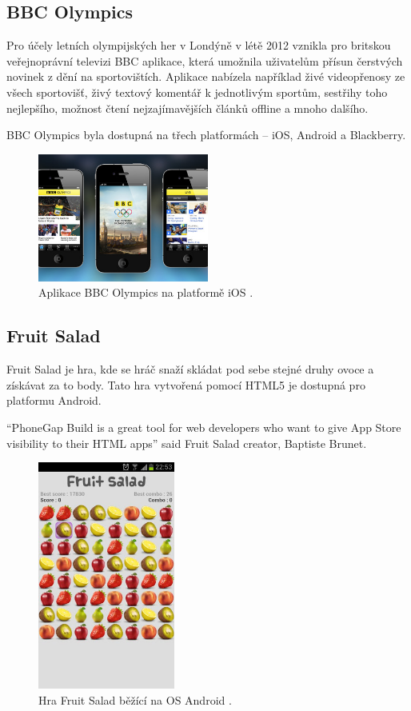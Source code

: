 \subsection{BBC Olympics}
Pro účely letních olympijských her v Londýně v létě 2012 vznikla pro britskou veřejnoprávní televizi BBC aplikace, která umožnila uživatelům přísun čerstvých novinek z dění na sportovištích. Aplikace nabízela například živé videopřenosy ze všech sportovišť, živý textový komentář k jednotlivým sportům, sestřihy toho nejlepšího, možnost čtení nejzajímavějších článků offline a mnoho dalšího. \cite{phonegap_bbc_olympics_app}

BBC Olympics byla dostupná na třech platformách – iOS, Android a Blackberry.

\begin{figure}\centering
\includegraphics[width=0.5\textwidth]{bbc.jpg}
\caption{Aplikace BBC Olympics na platformě iOS \cite{dribbble_bbc_olympics}.}
\label{fig:BBCApp}
\end{figure} 

\subsection{Fruit Salad}
Fruit Salad je hra, kde se hráč snaží skládat pod sebe stejné druhy ovoce a získávat za to body. Tato hra vytvořená pomocí HTML5 je dostupná pro platformu Android.

“PhoneGap Build is a great tool for web developers who want to give App Store visibility to their HTML apps” said Fruit Salad creator, Baptiste Brunet. \cite{phonegap_fruit_salad}

\begin{figure}\centering
\includegraphics[width=0.4\textwidth]{fruitsalad.jpg}
\caption{Hra Fruit Salad běžící na OS Android \cite{phonegap_fruit_salad}.}
\label{fig:FruitSalad}
\end{figure} 

